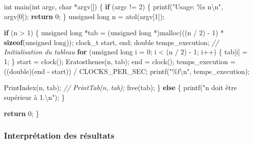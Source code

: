 \documentclass[
]{article}
\newenvironment{Shaded}{}{}
\newcommand{\CommentTok}[1]{\textcolor[rgb]{0.38,0.63,0.69}{\textit{#1}}}
\newcommand{\ControlFlowTok}[1]{\textcolor[rgb]{0.00,0.44,0.13}{\textbf{#1}}}
\newcommand{\DataTypeTok}[1]{\textcolor[rgb]{0.56,0.13,0.00}{#1}}
\newcommand{\DecValTok}[1]{\textcolor[rgb]{0.25,0.63,0.44}{#1}}
\newcommand{\KeywordTok}[1]{\textcolor[rgb]{0.00,0.44,0.13}{\textbf{#1}}}
\newcommand{\NormalTok}[1]{#1}
\newcommand{\SpecialCharTok}[1]{\textcolor[rgb]{0.25,0.44,0.63}{#1}}
\newcommand{\StringTok}[1]{\textcolor[rgb]{0.25,0.44,0.63}{#1}}
\begin{document}
\begin{Shaded}
\begin{Highlighting}[]
\DataTypeTok{int}\NormalTok{ main(}\DataTypeTok{int}\NormalTok{ argc, }\DataTypeTok{char}\NormalTok{ *argv[])}
\NormalTok{\{}
    \ControlFlowTok{if}\NormalTok{ (argc != }\DecValTok{2}\NormalTok{)}
\NormalTok{    \{}
\NormalTok{        printf(}\StringTok{"Usage: \%s n}\SpecialCharTok{\textbackslash{}n}\StringTok{"}\NormalTok{, argv[}\DecValTok{0}\NormalTok{]);}
        \ControlFlowTok{return} \DecValTok{0}\NormalTok{;}
\NormalTok{    \}}
    \DataTypeTok{unsigned} \DataTypeTok{long}\NormalTok{ n = atol(argv[}\DecValTok{1}\NormalTok{]);}

    \ControlFlowTok{if}\NormalTok{ (n \textgreater{} }\DecValTok{1}\NormalTok{)}
\NormalTok{    \{}
        \DataTypeTok{unsigned} \DataTypeTok{long}\NormalTok{ *tab = (}\DataTypeTok{unsigned} \DataTypeTok{long}\NormalTok{ *)malloc(((n / }\DecValTok{2}\NormalTok{) {-} }\DecValTok{1}\NormalTok{) * }\KeywordTok{sizeof}\NormalTok{(}\DataTypeTok{unsigned} \DataTypeTok{long}\NormalTok{));}
\NormalTok{        clock\_t start, end;}
        \DataTypeTok{double}\NormalTok{ temps\_execution;}
        \CommentTok{// Initialisation du tableau}
        \ControlFlowTok{for}\NormalTok{ (}\DataTypeTok{unsigned} \DataTypeTok{long}\NormalTok{ i = }\DecValTok{0}\NormalTok{; i \textless{} (n / }\DecValTok{2}\NormalTok{) {-} }\DecValTok{1}\NormalTok{; i++)}
\NormalTok{        \{}
\NormalTok{            tab[i] = }\DecValTok{1}\NormalTok{;}
\NormalTok{        \}}
\NormalTok{        start = clock();}
\NormalTok{        Eratosthenes(n, tab);}
\NormalTok{        end = clock();}
\NormalTok{        temps\_execution = ((}\DataTypeTok{double}\NormalTok{)(end {-} start)) / CLOCKS\_PER\_SEC;}
\NormalTok{        printf(}\StringTok{"\%f}\SpecialCharTok{\textbackslash{}n}\StringTok{"}\NormalTok{, temps\_execution);}

\NormalTok{        PrintIndex(n, tab);}
        \CommentTok{// PrintTab(n, tab);}
\NormalTok{        free(tab);}
\NormalTok{    \}}
    \ControlFlowTok{else}
\NormalTok{    \{}
\NormalTok{        printf(}\StringTok{"n doit être supérieur à 1.}\SpecialCharTok{\textbackslash{}n}\StringTok{"}\NormalTok{);}
\NormalTok{    \}}

    \ControlFlowTok{return} \DecValTok{0}\NormalTok{;}
\NormalTok{\}}
\end{Highlighting}
\end{Shaded}

\hypertarget{interpruxe9tation-des-ruxe9sultats}{%
\subsubsection{Interprétation des
résultats}\label{interpruxe9tation-des-ruxe9sultats}}
\end{document}
